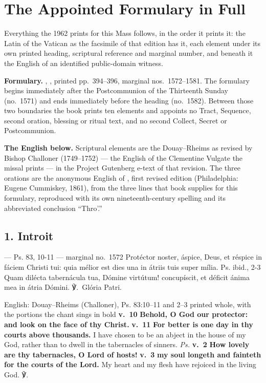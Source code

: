 \section*{The Appointed Formulary in Full}

Everything the 1962  prints for this Mass follows, in
the order it prints it: the Latin of the Vatican  as the
facsimile of that edition has it, each element under its own printed heading,
scriptural reference and marginal number, and beneath it the English of an
identified public-domain witness.

\textbf{Formulary.} ,
, printed pp.~394--396, marginal nos.\ 1572--1581. The
formulary begins
immediately after the Postcommunion of the Thirteenth Sunday (no.\ 1571) and
ends immediately before the heading  (no.\ 1582). Between those two boundaries the book prints ten
elements and appoints no Tract, Sequence, second oration, blessing or ritual
text, and no second Collect, Secret or Postcommunion.

\textbf{The English below.} Scriptural elements are the Douay--Rheims as revised
by Bishop Challoner (1749--1752) --- the English of the Clementine Vulgate the
missal prints --- in the Project Gutenberg e-text of that revision. The three
orations are the anonymous English of , first revised edition
(Philadelphia: Eugene Cummiskey, 1861), from the three lines that book supplies
for this formulary, reproduced with its own nineteenth-century spelling and its
abbreviated conclusion ``Thro'.''

\elementguard
\subsection*{1. Introit }

\begin{appointedlatin}{ --- Ps. 83, 10-11 --- marginal no.\ 1572}
Protéctor noster, áspice, Deus, et réspice in fáciem Christi tui: quia mélior
est dies una in átriis tuis super mília. \textnormal{Ps. ibid., 2-3} Quam
dilécta tabernácula tua, Dómine virtútum! concupíscit, et déficit ánima mea in
átria Dómini. ℣.~Glória Patri.
\end{appointedlatin}

\begin{namedtranslation}{English: Douay--Rheims (Challoner), Ps. 83:10--11 and 2--3 printed whole, with the portions the chant sings in bold}
\textbf{v.~10} \textbf{Behold, O God our protector: and look on the face of thy
Christ.} \textbf{v.~11} \textbf{For better is one day in thy courts above
thousands.} I have chosen to be an abject in the house of my God, rather than
to dwell in the tabernacles of sinners. \textit{Ps.} \textbf{v.~2} \textbf{How
lovely are thy tabernacles, O Lord of hosts!} \textbf{v.~3} \textbf{my soul
longeth and fainteth for the courts of the Lord.} My heart and my flesh have
rejoiced in the living God. ℣.~
\end{namedtranslation}

